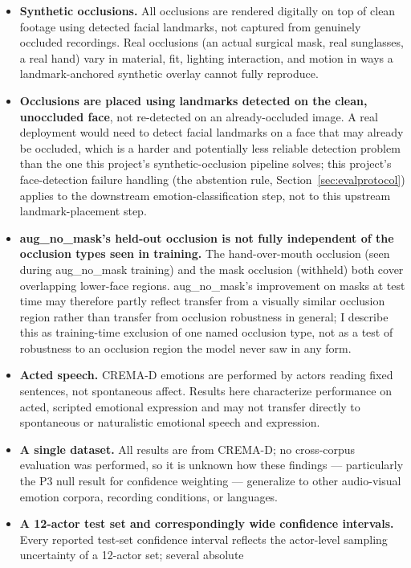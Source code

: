 \documentclass[10pt]{article}
\begin{document}
\begin{itemize}
\item \textbf{Synthetic occlusions.} All occlusions are rendered digitally on top of clean footage using detected
  facial landmarks, not captured from genuinely occluded recordings. Real occlusions (an actual surgical
  mask, real sunglasses, a real hand) vary in material, fit, lighting interaction, and motion in ways a
  landmark-anchored synthetic overlay cannot fully reproduce.
\item \textbf{Occlusions are placed using landmarks detected on the clean, unoccluded face}, not re-detected on an
  already-occluded image. A real deployment would need to detect facial landmarks on a face that may
  already be occluded, which is a harder and potentially less reliable detection problem than the one
  this project's synthetic-occlusion pipeline solves; this project's face-detection failure handling
  (the abstention rule, Section~\ref{sec:evalprotocol}) applies to the downstream emotion-classification step, not to this
  upstream landmark-placement step.
\item \textbf{aug\_no\_mask's held-out occlusion is not fully independent of the occlusion types seen in
  training.} The hand-over-mouth occlusion (seen during aug\_no\_mask training) and the mask occlusion
  (withheld) both cover overlapping lower-face regions. aug\_no\_mask's improvement on masks at test time
  may therefore partly reflect transfer from a visually similar occlusion region rather than transfer
  from occlusion robustness in general; I describe this as training-time exclusion of one named
  occlusion type, not as a test of robustness to an occlusion region the model never saw in any form.
\item \textbf{Acted speech.} CREMA-D emotions are performed by actors reading fixed sentences, not spontaneous
  affect. Results here characterize performance on acted, scripted emotional expression and may not
  transfer directly to spontaneous or naturalistic emotional speech and expression.
\item \textbf{A single dataset.} All results are from CREMA-D; no cross-corpus evaluation was performed, so it is
  unknown how these findings --- particularly the P3 null result for confidence weighting --- generalize to
  other audio-visual emotion corpora, recording conditions, or languages.
\item \textbf{A 12-actor test set and correspondingly wide confidence intervals.} Every reported test-set
  confidence interval reflects the actor-level sampling uncertainty of a 12-actor set; several absolute

\end{itemize}
\end{document}

